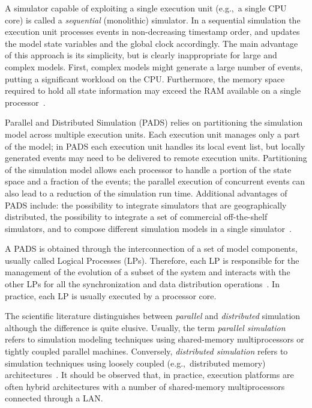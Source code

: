 \documentclass[1p]{elsarticle}
\begin{document}
A simulator capable of exploiting a single execution unit (e.g.,~a
single CPU core) is called a \emph{sequential} (monolithic)
simulator. In a sequential simulation the execution unit processes
events in non-decreasing timestamp order, and updates the model state
variables and the global clock accordingly. The main advantage of this
approach is its simplicity, but is clearly inappropriate for large and
complex models. First, complex models might generate a large number of
events, putting a significant workload on the CPU. Furthermore, the
memory space required to hold all state information may exceed the RAM
available on a single processor~\cite{1668384}.

Parallel and Distributed Simulation (PADS) relies on partitioning the
simulation model across multiple execution units. Each execution unit
manages only a part of the model; in PADS each execution unit handles
its local event list, but locally generated events may need to be
delivered to remote execution units. Partitioning of the simulation
model allows each processor to handle a portion of the state space and
a fraction of the events; the parallel execution of concurrent events
can also lead to a reduction of the simulation run time. Additional
advantages of PADS include: the possibility to integrate simulators
that are geographically distributed, the possibility to integrate a
set of commercial off-the-shelf simulators, and to compose different
simulation models in a single simulator~\cite{FUJ00}.

A PADS is obtained through the interconnection of a set of model
components, usually called Logical Processes (LPs). Therefore, each LP
is responsible for the management of the evolution of a subset of the
system and interacts with the other LPs for all the synchronization
and data distribution operations~\cite{FUJ00}. In practice, each LP is
usually executed by a processor core. 

The scientific literature distinguishes between \emph{parallel} and
\emph{distributed} simulation although the difference is quite
elusive. Usually, the term \emph{parallel simulation} refers to
simulation modeling techniques using shared-memory multiprocessors or
tightly coupled parallel machines. Conversely, \emph{distributed
  simulation} refers to simulation techniques using loosely coupled
(e.g.,~distributed memory) architectures~\cite{perumalla2007}. It
should be observed that, in practice, execution platforms are often
hybrid architectures with a number of shared-memory multiprocessors
connected through a LAN.
\end{document}

